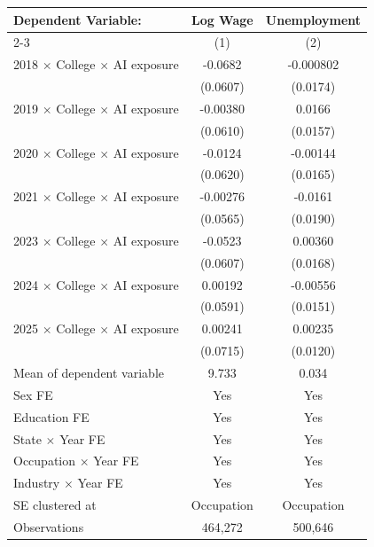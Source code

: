 \def\sym#1{\ifmmode^{#1}\else\(^{#1}\)\fi}
\begin{tabular}{l*{2}{c}}
\toprule
Dependent Variable: & Log Wage & Unemployment \\
\cmidrule(lr){2-3}
 & (1) & (2) \\
\midrule
2018 $\times$ College $\times$ AI exposure&     -0.0682   &   -0.000802   \\
            &    (0.0607)   &    (0.0174)   \\
2019 $\times$ College $\times$ AI exposure&    -0.00380   &      0.0166   \\
            &    (0.0610)   &    (0.0157)   \\
2020 $\times$ College $\times$ AI exposure&     -0.0124   &    -0.00144   \\
            &    (0.0620)   &    (0.0165)   \\
2021 $\times$ College $\times$ AI exposure&    -0.00276   &     -0.0161   \\
            &    (0.0565)   &    (0.0190)   \\
2023 $\times$ College $\times$ AI exposure&     -0.0523   &     0.00360   \\
            &    (0.0607)   &    (0.0168)   \\
2024 $\times$ College $\times$ AI exposure&     0.00192   &    -0.00556   \\
            &    (0.0591)   &    (0.0151)   \\
2025 $\times$ College $\times$ AI exposure&     0.00241   &     0.00235   \\
            &    (0.0715)   &    (0.0120)   \\
\midrule
Mean of dependent variable&       9.733   &       0.034   \\
Sex FE      &         Yes   &         Yes   \\
Education FE&         Yes   &         Yes   \\
State $\times$ Year FE&         Yes   &         Yes   \\
Occupation $\times$ Year FE&         Yes   &         Yes   \\
Industry $\times$ Year FE&         Yes   &         Yes   \\
SE clustered at&  Occupation   &  Occupation   \\
Observations&     464,272   &     500,646   \\
\bottomrule
\end{tabular}
